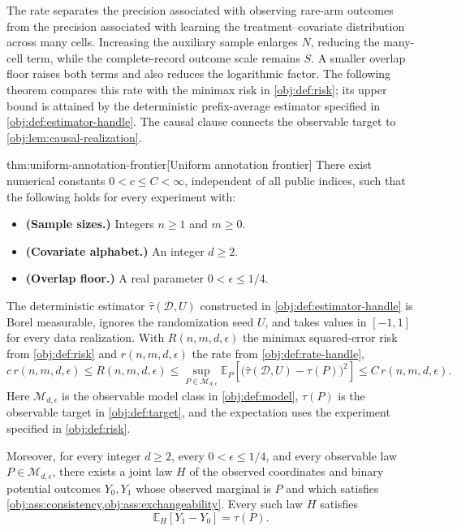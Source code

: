 The rate separates the precision associated with observing rare-arm outcomes from the precision associated with learning the treatment--covariate distribution across many cells. Increasing the auxiliary sample enlarges \(N\), reducing the many-cell term, while the complete-record outcome scale remains \(S\). A smaller overlap floor raises both terms and also reduces the logarithmic factor. The following theorem compares this rate with the minimax risk in \cref{obj:def:risk}; its upper bound is attained by the deterministic prefix-average estimator  specified in \cref{obj:def:estimator-handle}. The causal clause connects the observable target to \cref{obj:lem:causal-realization}.

\begin{theoremv}{thm:uniform-annotation-frontier}[Uniform annotation frontier]
There exist numerical constants \(0<c\le C<\infty\), independent of all public indices, such that the following holds for every experiment with:
\begin{itemize}
\item \textbf{(Sample sizes.)} Integers \(n\ge1\) and \(m\ge0\).
\item \textbf{(Covariate alphabet.)} An integer \(d\ge2\).
\item \textbf{(Overlap floor.)} A real parameter \(0<\epsilon\le1/4\).
\end{itemize}
The deterministic estimator \(\widehat\tau(\mathcal D,U)\) constructed in \cref{obj:def:estimator-handle} is Borel measurable, ignores the randomization seed \(U\), and takes values in \([-1,1]\) for every data realization. With \(R(n,m,d,\epsilon)\) the minimax squared-error risk from \cref{obj:def:risk} and \(r(n,m,d,\epsilon)\) the rate from \cref{obj:def:rate-handle},
\[
c\,r(n,m,d,\epsilon)
\le R(n,m,d,\epsilon)
\le \sup_{P\in\mathcal M_{d,\epsilon}}
\mathbb E_P\!\left[
\bigl(\widehat\tau(\mathcal D,U)-\tau(P)\bigr)^2
\right]
\le C\,r(n,m,d,\epsilon).
\]
Here \(\mathcal M_{d,\epsilon}\) is the observable model class in \cref{obj:def:model}, \(\tau(P)\) is the observable target in \cref{obj:def:target}, and the expectation uses the experiment specified in \cref{obj:def:risk}.

Moreover, for every integer \(d\ge2\), every \(0<\epsilon\le1/4\), and every observable law \(P\in\mathcal M_{d,\epsilon}\), there exists a joint law \(H\) of the observed coordinates and binary potential outcomes \(Y_0,Y_1\) whose observed marginal is \(P\) and which satisfies \cref{obj:ass:consistency,obj:ass:exchangeability}. Every such law \(H\) satisfies
\[
\mathbb E_H[Y_1-Y_0]=\tau(P).
\]
\end{theoremv}

